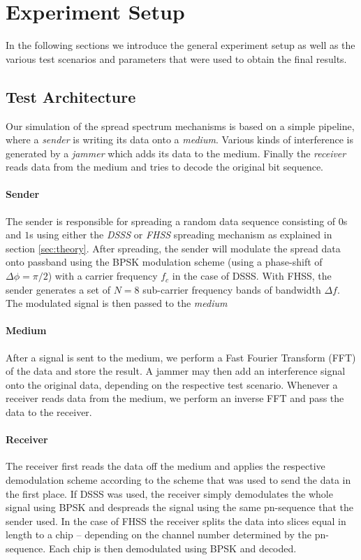 \section{Experiment Setup}

	In the following sections we introduce the general experiment setup as well as the various test scenarios and parameters that were used to obtain the final results.
	
	\subsection{Test Architecture}
	Our simulation of the spread spectrum mechanisms is based on a simple pipeline, where a \emph{sender} is writing its data onto a \emph{medium}. Various kinds of interference is generated by a \emph{jammer} which adds its data to the medium. Finally the \emph{receiver} reads data from the medium and tries to decode the original bit sequence.
	
	\paragraph{Sender}
	The sender is responsible for spreading a random data sequence consisting of $0$s and $1$s using either the \emph{DSSS} or \emph{FHSS} spreading mechanism as explained in section \ref{sec:theory}. After spreading, the sender will modulate the spread data onto passband using the BPSK modulation scheme (using a phase-shift of $\Delta \phi = \pi / 2$) with a carrier frequency $f_c$ in the case of DSSS. With FHSS, the sender generates a set of $N=8$ sub-carrier frequency bands of bandwidth $\Delta f$. The modulated signal is then passed to the \emph{medium}
	
	\paragraph{Medium} 
	After a signal is sent to the medium, we perform a Fast Fourier Transform (FFT) of the data and store the result. A jammer may then add an interference signal onto the original data, depending on the respective test scenario. Whenever a receiver reads data from the medium, we perform an inverse FFT and pass the data to the receiver.
	
	\paragraph{Receiver}
	The receiver first reads the data off the medium and applies the respective demodulation scheme according to the scheme that was used to send the data in the first place. If DSSS was used, the receiver simply demodulates the whole signal using BPSK and despreads the signal using the same pn-sequence that the sender used. In the case of FHSS the receiver splits the data into slices equal in length to a chip -- depending on the channel number determined by the pn-sequence. Each chip is then demodulated using BPSK and decoded. 
		
